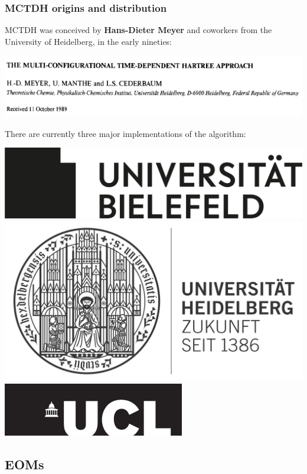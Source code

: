\documentclass{beamer}
\begin{document}
\begin{frame} 
  \frametitle{MCTDH origins and distribution}
  MCTDH was conceived by \textbf{Hans-Dieter Meyer} and coworkers from the University of Heidelberg, in the early nineties\@:
\begin{center}
  \includegraphics[scale=0.5, cfbox=blue 1pt]{first_mctdh.png}
\end{center}
There are currently three major implementations of the algorithm:
\begin{center}
  \includegraphics[scale=.07]{manthe.png}
  \hspace{.5cm}
  \includegraphics[scale=.07]{dieter.jpg}
  \hspace{.5cm}
\includegraphics[scale=.2]{graham.png}
\end{center}

  
\end{frame}

\subsection{EOMs}\label{eom}
\end{document}
